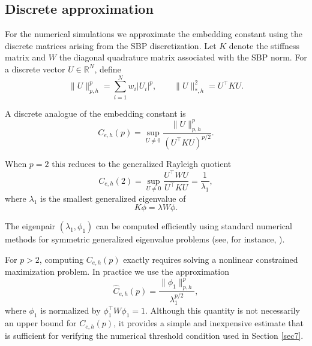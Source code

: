 \documentclass[12pt]{article}
\numberwithin{equation}{section}
\begin{document}
\subsection*{Discrete approximation}

For the numerical simulations we approximate the embedding constant
using the discrete matrices arising from the SBP discretization.
Let $K$ denote the stiffness matrix and $W$ the diagonal quadrature
matrix associated with the SBP norm. For a discrete vector
$U\in\mathbb{R}^N$, define
\[
\|U\|_{p,h}^p=\sum_{i=1}^N w_i |U_i|^p,
\qquad
\|U\|_{*,h}^2=U^\top K U .
\]

A discrete analogue of the embedding constant is
\[
C_{e,h}(p)=
\sup_{U\neq0}
\frac{\|U\|_{p,h}^p}{(U^\top K U)^{p/2}}.
\]

When $p=2$ this reduces to the generalized Rayleigh quotient
\[
C_{e,h}(2)
=
\sup_{U\neq0}\frac{U^\top W U}{U^\top K U}
=
\frac{1}{\lambda_1},
\]
where $\lambda_1$ is the smallest generalized eigenvalue of
\[
K\phi=\lambda W\phi .
\]

The eigenpair $(\lambda_1,\phi_1)$ can be computed efficiently
using standard numerical methods for symmetric generalized
eigenvalue problems (see, for instance, \cite{Parlett1998}).

For $p>2$, computing $C_{e,h}(p)$ exactly requires solving a
nonlinear constrained maximization problem. In practice we use
the approximation
\[
\widehat C_{e,h}(p)
=
\frac{\|\phi_1\|_{p,h}^p}{\lambda_1^{p/2}},
\]
where $\phi_1$ is normalized by $\phi_1^\top W\phi_1=1$.
Although this quantity is not necessarily an upper bound for
$C_{e,h}(p)$, it provides a simple and inexpensive estimate that
is sufficient for verifying the numerical threshold condition
used in Section \ref{sec7}.
\end{document}
